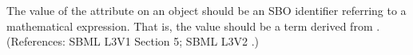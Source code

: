 The value of the attribute  on an \InitialAssignment object
should be an SBO identifier referring to a mathematical expression.  That
is, the value should be a term derived from \sbomathformula.  (References:
SBML L3V1 Section 5; SBML L3V2 .)
